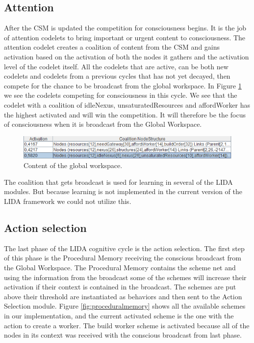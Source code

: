 \subsection{Attention}
After the CSM is updated the competition for consciousness begins. It is the job of attention codelets to bring important or urgent content to consciousness. The attention codelet creates a coalition of content from the CSM and gains activation based on the activation of both the nodes it gathers and the activation level of the codelet itself. All the codelets that are active, can be both new codelets and codelets from a previous cycles that has not yet decayed, then compete for the chance to be broadcast from the global workspace. In Figure \ref{fig:workspace} we see the codelets competing for consciousness in this cycle. We see that the codelet with a coalition of idleNexus, unsaturatedResources and affordWorker has the highest activated and will win the competition. It will therefore be the focus of consciousness when it is broadcast from the Global Workspace.

\begin{figure}[h!tb]
\centering
\includegraphics[width=\textwidth]{graphics/global_workspace.png}
\caption{Content of the global workspace.}
\label{fig:workspace}
\end{figure}

The coalition that gets broadcast is used for learning in several of the LIDA modules. But because learning is not implemented in the current version of the LIDA framework we could not utilize this.

\subsection{Action selection}
\label{sec:action_selection}
The last phase of the LIDA cognitive cycle is the action selection. The first step of this phase is the Procedural Memory receiving the conscious broadcast from the Global Workspace. The Procedural Memory contains the scheme net and using the information from the broadcast some of the schemes will increase their activation if their context is contained in the broadcast. The schemes are put above their threshold are instantiated as behaviors and then sent to the Action Selection module. Figure \ref{fig:proceduralmemory} shows all the available schemes in our implementation, and the current activated scheme is the one with the action to create a worker. The build worker scheme is activated because all of the nodes in its context was received with the conscious broadcast from last phase.

